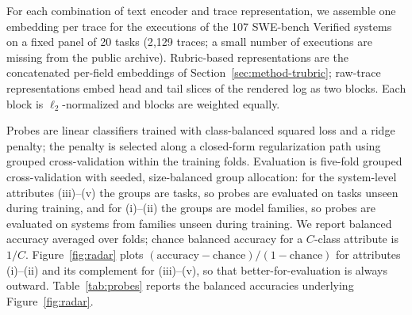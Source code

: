 \documentclass{article}
\begin{document}
For each combination of text encoder and trace representation, we assemble one embedding per trace for the executions of the 107 SWE-bench Verified systems on a fixed panel of 20 tasks (2{,}129 traces; a small number of executions are missing from the public archive).
Rubric-based representations are the concatenated per-field embeddings of Section~\ref{sec:method-trubric}; raw-trace representations embed head and tail slices of the rendered log as two blocks.
Each block is $\ell_{2}$-normalized and blocks are weighted equally.

Probes are linear classifiers trained with class-balanced squared loss and a ridge penalty; the penalty is selected along a closed-form regularization path using grouped cross-validation within the training folds.
Evaluation is five-fold grouped cross-validation with seeded, size-balanced group allocation: for the system-level attributes (iii)--(v) the groups are tasks, so probes are evaluated on tasks unseen during training, and for (i)--(ii) the groups are model families, so probes are evaluated on systems from families unseen during training.
We report balanced accuracy averaged over folds; chance balanced accuracy for a $C$-class attribute is $1/C$.
Figure~\ref{fig:radar} plots $(\mathrm{accuracy} - \mathrm{chance})/(1 - \mathrm{chance})$ for attributes (i)--(ii) and its complement for (iii)--(v), so that better-for-evaluation is always outward.
Table~\ref{tab:probes} reports the balanced accuracies underlying Figure~\ref{fig:radar}.
\end{document}
